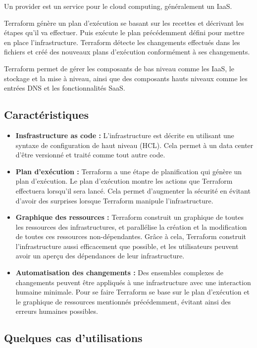 \documentclass[]{article}
\begin{document}
Un provider est un service pour le cloud computing, généralement un
IaaS.

Terraform génère un plan d'exécution se basant sur les recettes et
décrivant les étapes qu'il va effectuer. Puis exécute le plan
précédemment défini pour mettre en place l'infrastructure. Terraform
détecte les changements effectués dans les fichiers et créé des nouveaux
plans d'exécution conformément à ses changements.

Terraform permet de gérer les composants de bas niveau comme les IaaS,
le stockage et la mise à niveau, ainsi que des composants hauts niveaux
comme les entrées DNS et les fonctionnalités SaaS.

\subsection{Caractéristiques}\label{caractuxe9ristiques}

\begin{itemize}
\item
  \textbf{Insfrastructure as code :} L'infrastructure est décrite en
  utilisant une syntaxe de configuration de haut niveau (HCL). Cela
  permet à un data center d'être versionné et traité comme tout autre
  code.
\item
  \textbf{Plan d'exécution :} Terraform a une étape de \og
  planification \fg qui génère un plan d'exécution. Le
  plan d'exécution montre les actions que Terraform effectuera lorsqu'il
  sera lancé. Cela permet d'augmenter la sécurité en évitant d'avoir des
  surprises lorsque Terraform manipule l'infrastructure.
\item
  \textbf{Graphique des ressources :} Terraform construit un graphique de
  toutes les ressources des infrastructures, et parallélise la création
  et la modification de toutes ces ressources non-dépendantes. Grâce à
  cela, Terraform construit l'infrastructure aussi efficacement que
  possible, et les utilisateurs peuvent avoir un aperçu des dépendances
  de leur infrastructure.
\item
  \textbf{Automatisation des changements :} Des ensembles complexes de
  changements peuvent être appliqués à une infrastructure avec une
  interaction humaine minimale. Pour se faire Terraform se base sur le
  plan d'exécution et le graphique de ressources mentionnés
  précédemment, évitant ainsi des erreurs humaines possibles.
\end{itemize}

\subsection{Quelques cas d'utilisations}\label{quelques-cas-dutilisations}
\end{document}
